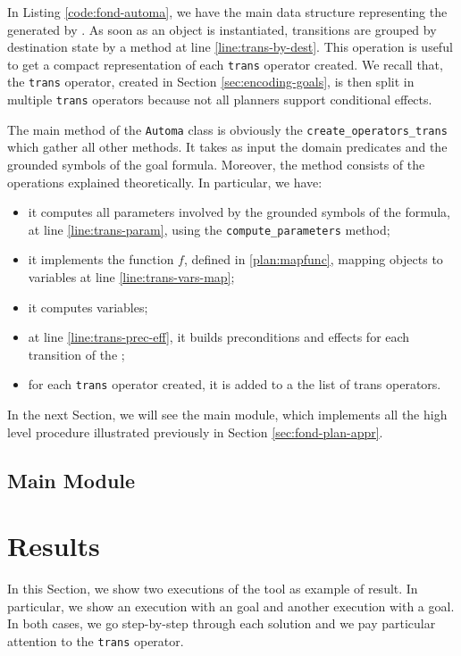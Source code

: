In Listing \ref{code:fond-automa}, we have the main data structure representing the \DFA generated by \LTLfToDFA. As soon as an object is instantiated, transitions are grouped by destination state by a method at line \ref{line:trans-by-dest}. This operation is useful to get a compact representation of each \texttt{trans} operator created. We recall that, the \texttt{trans} operator, created in Section \ref{sec:encoding-goals}, is then split in multiple \texttt{trans} operators because not all planners support conditional effects.

The main method of the \texttt{Automa} class is obviously the \texttt{create\_operators\_trans} which gather all other methods. It takes as input the domain predicates and the grounded symbols of the goal formula. Moreover, the method consists of the operations explained theoretically. In particular, we have:
\begin{itemize}
\item it computes all parameters involved by the grounded symbols of the formula, at line \ref{line:trans-param}, using the \texttt{compute\_parameters} method;
\item it implements the function $f$, defined in \ref{plan:mapfunc}, mapping objects to variables at line \ref{line:trans-vars-map};
\item it computes variables;
\item at line \ref{line:trans-prec-eff}, it builds preconditions and effects for each transition of the \DFA;
\item for each \texttt{trans} operator created, it is added to a the list of trans operators.
\end{itemize}

In the next Section, we will see the main module, which implements all the high level procedure illustrated previously in Section \ref{sec:fond-plan-appr}.
\subsection{Main Module}


\section{Results}\label{sec:planning-results}
In this Section, we show two executions of the \FONDFOR tool as example of result. In particular, we show an execution with an \LTLf goal and another execution with a \PLTL goal. In both cases, we go step-by-step through each solution and we pay particular attention to the \texttt{trans} operator.

